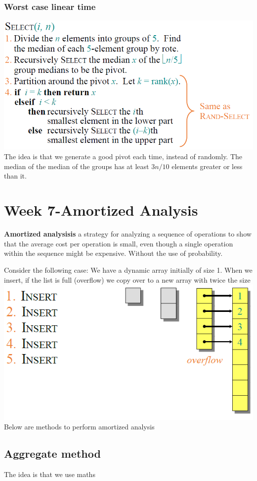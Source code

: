 \documentclass{article}
\begin{document}
\begin{multicols*}{4}
\subsubsection{Worst case linear time}
\includegraphics[width=\linewidth]{./images/worstcaseselect.png}
The idea is that we generate a good pivot each time, instead of randomly.
The median of the median of the groups has at least $3n/10$ elements greater or less than it.

\section{Week 7-Amortized Analysis}
\textbf{Amortized analysisis} a strategy for analyzing a sequence of operations to show that the average cost per operation is small, even though a single operation within the sequence might be expensive. Without the use of probability.

Consider the following case: We have a dynamic array initially of size 1. When we insert, if the list is full (overflow) we copy over to a new array with twice the size
\includegraphics[width=\linewidth]{./images/dynamic.png}
Below are methods to perform amortized analysis
\subsection{Aggregate method}
The idea is that we use maths


\end{multicols*}
\end{document}
